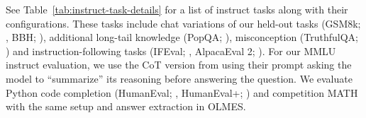 \documentclass[table]{ai2style/ai2}
\begin{document}
See Table~\ref{tab:instruct-task-details} for a list of instruct tasks along with their configurations. 
These tasks include chat variations of our held-out tasks (GSM8k; \citealp{cobbe2021trainingverifierssolvemath}, BBH; \citealp{suzgun2022challengingbigbenchtaskschainofthought}), additional long-tail knowledge (PopQA; \citealp{mallen2023llm_memorization}), misconception (TruthfulQA; \citealp{lin2021truthfulqa}) and instruction-following tasks (IFEval; \citealp{zhou2023instructionfollowingevaluationlargelanguage}, AlpacaEval 2; \citealp{dubois2024length}). 
For our MMLU instruct evaluation, we use the CoT version from \citet{lambert2024tulu3} using their prompt asking the model to ``summarize'' its reasoning before answering the question. 
We evaluate Python code completion (HumanEval; \citealp{chen2021codex}, HumanEval+; \citealp{evalplus}) and competition MATH~\citep{hendrycksmath2021} with the same setup and answer extraction in OLMES.
\end{document}
